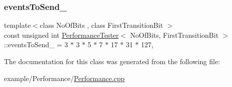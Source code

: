 \mbox{\label{class_performance_tester_a0a244ac329b50e4619efcc4adf8c2c08}} 
\subsubsection{\texorpdfstring{events\+To\+Send\+\_\+}{eventsToSend\_}}
{\footnotesize\ttfamily template$<$class No\+Of\+Bits , class First\+Transition\+Bit $>$ \\
const unsigned int \mbox{\hyperlink{class_performance_tester}{Performance\+Tester}}$<$ No\+Of\+Bits, First\+Transition\+Bit $>$\+::events\+To\+Send\+\_\+ = 3 $\ast$ 3 $\ast$ 5 $\ast$ 7 $\ast$ 17 $\ast$ 31 $\ast$ 127\hspace{0.3cm}{\ttfamily [static]}, {\ttfamily [private]}}



The documentation for this class was generated from the following file\+:\begin{DoxyCompactItemize}
\item 
example/\+Performance/\mbox{\hyperlink{_performance_8cpp}{Performance.\+cpp}}\end{DoxyCompactItemize}
